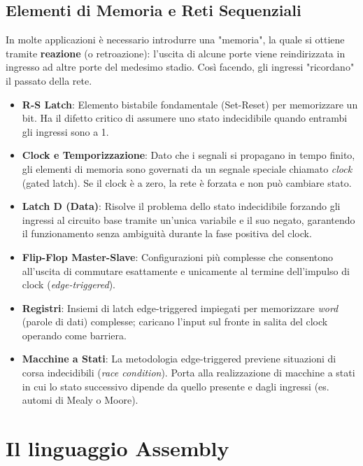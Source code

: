 \documentclass[12pt, a4paper]{article}
\begin{document}
\subsection{Elementi di Memoria e Reti Sequenziali}
In molte applicazioni è necessario introdurre una "memoria", la quale si ottiene tramite \textbf{reazione} (o retroazione): l'uscita di alcune porte viene reindirizzata in ingresso ad altre porte del medesimo stadio. Così facendo, gli ingressi "ricordano" il passato della rete.
\begin{itemize}
    \item \textbf{R-S Latch}: Elemento bistabile fondamentale (Set-Reset) per memorizzare un bit. Ha il difetto critico di assumere uno stato indecidibile quando entrambi gli ingressi sono a 1.
    \item \textbf{Clock e Temporizzazione}: Dato che i segnali si propagano in tempo finito, gli elementi di memoria sono governati da un segnale speciale chiamato \textit{clock} (gated latch). Se il clock è a zero, la rete è forzata e non può cambiare stato.
    \item \textbf{Latch D (Data)}: Risolve il problema dello stato indecidibile forzando gli ingressi al circuito base tramite un'unica variabile e il suo negato, garantendo il funzionamento senza ambiguità durante la fase positiva del clock.
    \item \textbf{Flip-Flop Master-Slave}: Configurazioni più complesse che consentono all'uscita di commutare esattamente e unicamente al termine dell'impulso di clock (\textit{edge-triggered}).
    \item \textbf{Registri}: Insiemi di latch edge-triggered impiegati per memorizzare \textit{word} (parole di dati) complesse; caricano l'input sul fronte in salita del clock operando come barriera.
    \item \textbf{Macchine a Stati}: La metodologia edge-triggered previene situazioni di corsa indecidibili (\textit{race condition}). Porta alla realizzazione di macchine a stati in cui lo stato successivo dipende da quello presente e dagli ingressi (es. automi di Mealy o Moore).
\end{itemize}

\section{Il linguaggio Assembly}
\end{document}

